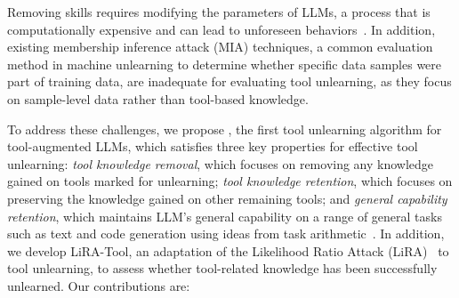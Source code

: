 % 
Removing skills requires  
modifying the parameters of LLMs, a process that is computationally expensive and can lead to unforeseen behaviors~\citep{ripple_effect,gu2024model}. In addition, existing membership inference attack (MIA) techniques, a common evaluation method in machine unlearning to determine whether specific data samples were part of training data, are inadequate for evaluating tool unlearning, as they focus on sample-level data rather than tool-based knowledge. 


To address these challenges, we propose \method, the first tool unlearning algorithm for tool-augmented LLMs, which satisfies three key properties for effective tool unlearning: 
{\em tool knowledge removal}, which focuses on removing any knowledge gained on tools marked for unlearning; 
{\em tool knowledge retention}, which focuses on preserving the knowledge gained on other remaining tools; and 
{\em general capability retention}, which maintains LLM's general capability on a range of general tasks such as text and code generation using ideas from task arithmetic~\citep{ilharco2023editing,barbulescu2024textual}.
%
In addition, we develop LiRA-Tool, an adaptation of the Likelihood Ratio Attack (LiRA)~\citep{lira} to tool unlearning, to assess whether tool-related knowledge has been successfully unlearned. Our contributions are: 


